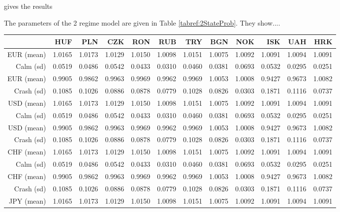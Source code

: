 \documentclass[12pt, a4paper, oneside]{article} %
\begin{document}
gives the results
 
 
The parameters of the 2 regime model are given in Table \ref{tabref:2StateProb}.  They show....


\begin{landscape}
\begin{table}[ht]
\centering
\begin{tabular}{rrrrrrrrrrrr}
  \hline
 & HUF & PLN & CZK & RON & RUB & TRY & BGN & NOK & ISK & UAH & HRK \\ 
  \hline
  EUR (mean) & 1.0165 & 1.0173 & 1.0129 & 1.0150 & 1.0098 & 1.0151 & 1.0075 & 1.0092 & 1.0091 & 1.0094 & 1.0091 \\ 
  Calm (sd) & 0.0519 & 0.0486 & 0.0542 & 0.0433 & 0.0310 & 0.0460 & 0.0381 & 0.0693 & 0.0532 & 0.0295 & 0.0251 \\ 
  EUR (mean) & 0.9905 & 0.9862 & 0.9963 & 0.9969 & 0.9962 & 0.9969 & 1.0053 & 1.0008 & 0.9427 & 0.9673 & 1.0082 \\ 
  Crash (sd) & 0.1085 & 0.1026 & 0.0886 & 0.0878 & 0.0779 & 0.1028 & 0.0826 & 0.0303 & 0.1871 & 0.1116 & 0.0737 \\ 
  \hline
  USD (mean) & 1.0165 & 1.0173 & 1.0129 & 1.0150 & 1.0098 & 1.0151 & 1.0075 & 1.0092 & 1.0091 & 1.0094 & 1.0091 \\ 
  Calm (sd) & 0.0519 & 0.0486 & 0.0542 & 0.0433 & 0.0310 & 0.0460 & 0.0381 & 0.0693 & 0.0532 & 0.0295 & 0.0251 \\ 
  USD (mean) & 0.9905 & 0.9862 & 0.9963 & 0.9969 & 0.9962 & 0.9969 & 1.0053 & 1.0008 & 0.9427 & 0.9673 & 1.0082 \\ 
  Crash (sd) & 0.1085 & 0.1026 & 0.0886 & 0.0878 & 0.0779 & 0.1028 & 0.0826 & 0.0303 & 0.1871 & 0.1116 & 0.0737 \\ 
  \hline
  CHF (mean)& 1.0165 & 1.0173 & 1.0129 & 1.0150 & 1.0098 & 1.0151 & 1.0075 & 1.0092 & 1.0091 & 1.0094 & 1.0091 \\ 
  Calm (sd)& 0.0519 & 0.0486 & 0.0542 & 0.0433 & 0.0310 & 0.0460 & 0.0381 & 0.0693 & 0.0532 & 0.0295 & 0.0251 \\ 
  CHF (mean) & 0.9905 & 0.9862 & 0.9963 & 0.9969 & 0.9962 & 0.9969 & 1.0053 & 1.0008 & 0.9427 & 0.9673 & 1.0082 \\ 
  Crash (sd) & 0.1085 & 0.1026 & 0.0886 & 0.0878 & 0.0779 & 0.1028 & 0.0826 & 0.0303 & 0.1871 & 0.1116 & 0.0737 \\ 
  \hline
  JPY (mean) & 1.0165 & 1.0173 & 1.0129 & 1.0150 & 1.0098 & 1.0151 & 1.0075 & 1.0092 & 1.0091 & 1.0094 & 1.0091 \\ 

\end{tabular}
\end{table}
\end{landscape}
\end{document}
